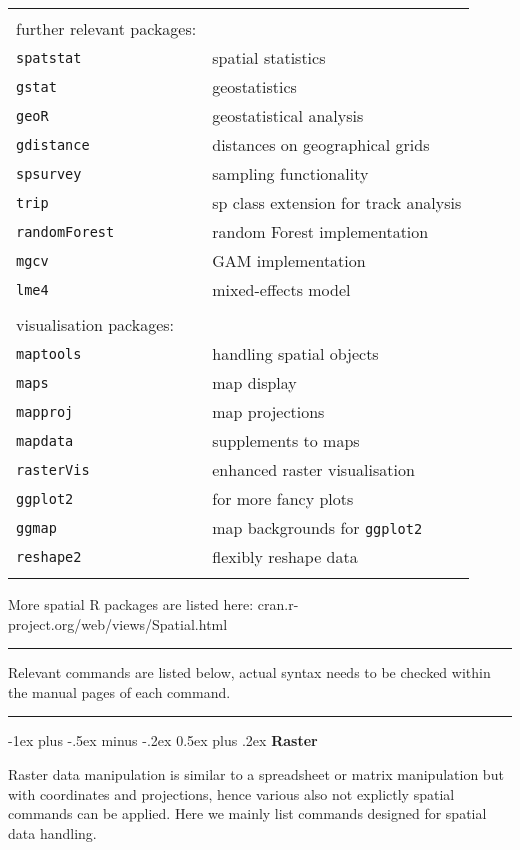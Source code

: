 \documentclass[a4paper,10pt,landscape]{article}
\makeatletter
\renewcommand{\section}{\@startsection{section}{1}{0mm}%
                                {-1ex plus -.5ex minus -.2ex}%
                                {0.5ex plus .2ex}%
                                {\normalfont\large\bfseries}}
\makeatother
\begin{document}
\begin{multicols}{3}
\begin{tabular}{@{}p{\the\MyLen}%
		@{}p{\linewidth-\the\MyLen}@{}}
& \\
further relevant packages:\\
% 
\verb!spatstat!  & spatial statistics\\
\verb!gstat!  & geostatistics\\
\verb!geoR!  & geostatistical analysis\\
\verb!gdistance!  & distances on geographical grids\\
\verb!spsurvey!  & sampling functionality\\
\verb!trip!  & sp class extension for track analysis\\
\verb!randomForest!  & random Forest implementation\\
\verb!mgcv!  & GAM implementation\\
\verb!lme4!  & mixed-effects model\\
% 
& \\
visualisation packages:\\
\verb!maptools!  & handling spatial objects\\
\verb!maps!  & map display\\
\verb!mapproj!  & map projections\\
\verb!mapdata!  & supplements to maps\\
\verb!rasterVis!  & enhanced raster visualisation\\
\verb!ggplot2!  & for more fancy plots\\
\verb!ggmap!  & map backgrounds for \verb!ggplot2!\\
\verb!reshape2!  & flexibly reshape data \\
 & 
\end{tabular}

More spatial R packages are listed here: cran.r-project.org/web/views/Spatial.html

\rule{0.32\textwidth}{0.4pt}
Relevant commands are listed below, actual syntax needs to be checked within the manual pages of each command. 
\rule{0.32\textwidth}{0.4pt}



\section{\textbf{Raster}}

Raster data manipulation is similar to a spreadsheet or matrix manipulation but with coordinates and projections, hence various also not explictly spatial commands can be applied. Here we  mainly list commands designed for spatial data handling.


\end{multicols}
\end{document}

